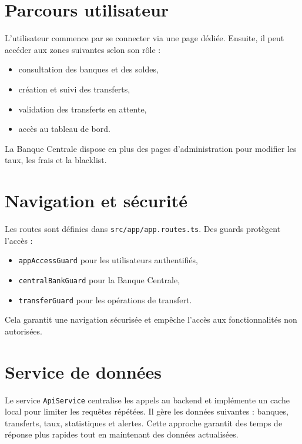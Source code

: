 \documentclass[a4paper,12pt]{report}
\begin{document}
\section{Parcours utilisateur}
L'utilisateur commence par se connecter via une page dédiée. Ensuite, il peut accéder aux zones suivantes selon son rôle :
\begin{itemize}[leftmargin=*,nosep]
  \item consultation des banques et des soldes,
  \item création et suivi des transferts,
  \item validation des transferts en attente,
  \item accès au tableau de bord.
\end{itemize}
La Banque Centrale dispose en plus des pages d'administration pour modifier les taux, les frais et la blacklist.

\section{Navigation et sécurité}
Les routes sont définies dans \texttt{src/app/app.routes.ts}. Des guards protègent l'accès :
\begin{itemize}[leftmargin=*,nosep]
  \item \texttt{appAccessGuard} pour les utilisateurs authentifiés,
  \item \texttt{centralBankGuard} pour la Banque Centrale,
  \item \texttt{transferGuard} pour les opérations de transfert.
\end{itemize}
Cela garantit une navigation sécurisée et empêche l'accès aux fonctionnalités non autorisées.

\section{Service de données}
Le service \texttt{ApiService} centralise les appels au backend et implémente un cache local pour limiter les requêtes répétées. Il gère les données suivantes : banques, transferts, taux, statistiques et alertes. Cette approche garantit des temps de réponse plus rapides tout en maintenant des données actualisées.
\end{document}
